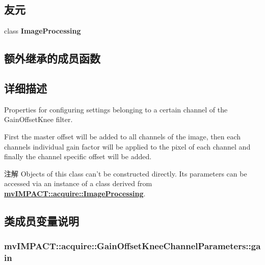 \subsection*{友元}
\begin{DoxyCompactItemize}
\item 
\hypertarget{classmv_i_m_p_a_c_t_1_1acquire_1_1_gain_offset_knee_channel_parameters_aed8a20fb12bb653b1bcd24b250b8e64f}{class {\bfseries Image\+Processing}}\label{classmv_i_m_p_a_c_t_1_1acquire_1_1_gain_offset_knee_channel_parameters_aed8a20fb12bb653b1bcd24b250b8e64f}

\end{DoxyCompactItemize}
\subsection*{额外继承的成员函数}


\subsection{详细描述}
Properties for configuring settings belonging to a certain channel of the Gain\+Offset\+Knee filter. 

First the master offset will be added to all channels of the image, then each channels individual gain factor will be applied to the pixel of each channel and finally the channel specific offset will be added.



\begin{DoxyNote}{注解}
Objects of this class can't be constructed directly. Its parameters can be accessed via an instance of a class derived from {\bfseries \hyperlink{classmv_i_m_p_a_c_t_1_1acquire_1_1_image_processing}{mv\+I\+M\+P\+A\+C\+T\+::acquire\+::\+Image\+Processing}}. 
\end{DoxyNote}


\subsection{类成员变量说明}
\hypertarget{classmv_i_m_p_a_c_t_1_1acquire_1_1_gain_offset_knee_channel_parameters_a90582e8fee2c3e3bffce3b3132573993}{
\subsubsection[{gain}]{ mv\+I\+M\+P\+A\+C\+T\+::acquire\+::\+Gain\+Offset\+Knee\+Channel\+Parameters\+::gain}}\label{classmv_i_m_p_a_c_t_1_1acquire_1_1_gain_offset_knee_channel_parameters_a90582e8fee2c3e3bffce3b3132573993}


